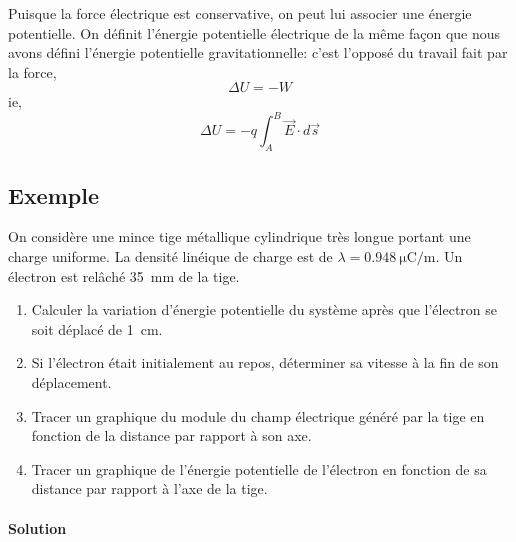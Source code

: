 
Puisque la force électrique est conservative, on peut lui associer une énergie
potentielle. On définit l'énergie potentielle électrique de la même façon que
nous avons défini l'énergie potentielle gravitationnelle: c'est l'opposé du
travail fait par la force,
$$\Delta U = -W$$
ie,
\[
  \Delta U = - q\int_A^B \vec{E} \cdot d\vec{s}
\]


\subsection*{Exemple}


On considère une mince tige métallique cylindrique très longue portant une
charge uniforme.  La densité linéique de charge est de $\lambda =
\SI{0.948}{\micro\coulomb\per\meter}$. Un électron est relâché \SI{35}{mm}
de la tige.

\begin{enumerate}
  \item Calculer la variation d'énergie potentielle du système après que
    l'électron se soit déplacé de \SI{1}{cm}.
  \item Si l'électron était initialement au repos, déterminer sa vitesse à la
    fin de son déplacement.
  \item Tracer un graphique du module du champ électrique généré par la tige en
    fonction de la distance par rapport à son axe.
  \item Tracer un graphique de l'énergie potentielle de l'électron en fonction
    de sa distance par rapport à l'axe de la tige.
\end{enumerate}

\paragraph{Solution}


